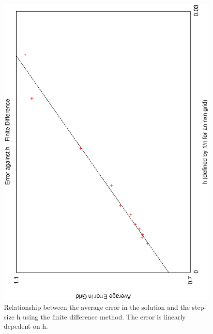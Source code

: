 \documentclass[aps,twocolumn,pre,nofootinbib,10pt]{revtex4-1}
\begin{document}
\begin{figure}
\includegraphics[height=\breite \columnwidth,angle=-90]{fd_h.eps}

\caption{Relationship between the average error in the solution and the step-size h using the finite difference method. The error is linearly depedent on h.}
\label{fig:fd_lin}
\end{figure}
\end{document}
